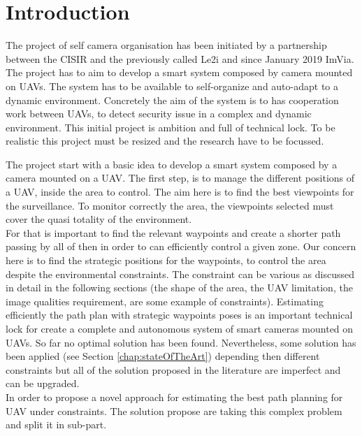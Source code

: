 \chapter{Introduction}\label{chap:Intro}



The project of self camera organisation has been initiated by a partnership between the CISIR and the previously called Le2i and since January 2019 ImVia. The project has to aim to develop a smart system composed by camera mounted on UAVs. The system has to be available to self-organize and auto-adapt to a dynamic environment. Concretely the aim of the system is to has  cooperation work between UAVs, to detect security issue in a complex and dynamic environment. This initial project is ambition and full of technical lock. To be realistic  this project must be resized and the research have to be focussed.%

The project start with a basic idea to develop a smart system composed by a camera mounted on a UAV. 
The first step, is to manage the different positions of a UAV, inside the area to control. The aim here is to find the best viewpoints  for the surveillance. To monitor correctly the area, the viewpoints selected must cover the quasi totality  of  the environment.\\
For that is important to find the relevant waypoints and create a shorter path passing by all of then in order to can efficiently control a given zone. Our concern here is to find the strategic positions for the waypoints, to control the area despite the environmental constraints. The constraint can be various as discussed in detail in the following sections (the shape of the area, the UAV limitation, the image qualities requirement, are some example of constraints). 
Estimating efficiently the path plan with strategic waypoints poses is an important technical lock for create a complete and autonomous system of smart cameras mounted on UAVs. So far no optimal solution has been found. Nevertheless, some solution has been applied (see Section \ref{chap:stateOfTheArt}) depending then different constraints but all of the solution proposed in the literature are imperfect and can be upgraded. \\
In order to propose a novel approach for estimating the best path planning for UAV under constraints. The solution  propose are taking this complex problem and split it in sub-part. 

